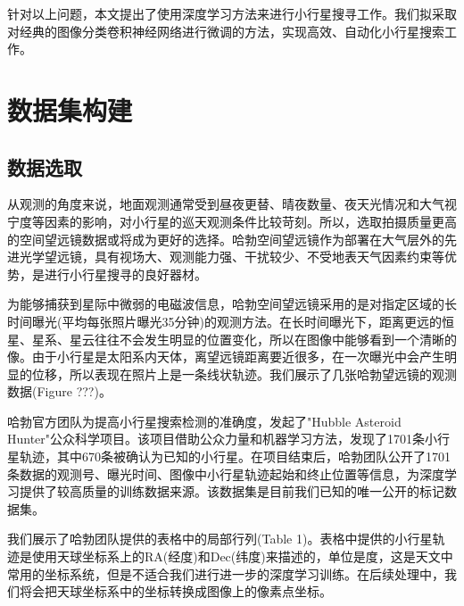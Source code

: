 \documentclass[12pt,a4paper]{article}%
\begin{document}
针对以上问题，本文提出了使用深度学习方法来进行小行星搜寻工作。我们拟采取对经典的图像分类卷积神经网络进行微调的方法，实现高效、自动化小行星搜索工作。

\section{数据集构建}

\subsection{数据选取}

从观测的角度来说，地面观测通常受到昼夜更替、晴夜数量、夜天光情况和大气视宁度等因素的影响，对小行星的巡天观测条件比较苛刻。所以，选取拍摄质量更高的空间望远镜数据或将成为更好的选择。哈勃空间望远镜作为部署在大气层外的先进光学望远镜，具有视场大、观测能力强、干扰较少、不受地表天气因素约束等优势，是进行小行星搜寻的良好器材。

为能够捕获到星际中微弱的电磁波信息，哈勃空间望远镜采用的是对指定区域的长时间曝光(平均每张照片曝光35分钟)的观测方法。在长时间曝光下，距离更远的恒星、星系、星云往往不会发生明显的位置变化，所以在图像中能够看到一个清晰的像。由于小行星是太阳系内天体，离望远镜距离要近很多，在一次曝光中会产生明显的位移，所以表现在照片上是一条线状轨迹。我们展示了几张哈勃望远镜的观测数据(Figure ???)。

哈勃官方团队为提高小行星搜索检测的准确度，发起了"Hubble Asteroid Hunter"公众科学项目。该项目借助公众力量和机器学习方法，发现了1701条小行星轨迹，其中670条被确认为已知的小行星。在项目结束后，哈勃团队公开了1701条数据的观测号、曝光时间、图像中小行星轨迹起始和终止位置等信息，为深度学习提供了较高质量的训练数据来源。该数据集是目前我们已知的唯一公开的标记数据集。

我们展示了哈勃团队提供的表格中的局部行列(Table 1)。表格中提供的小行星轨迹是使用天球坐标系上的RA(经度)和Dec(纬度)来描述的，单位是度，这是天文中常用的坐标系统，但是不适合我们进行进一步的深度学习训练。在后续处理中，我们将会把天球坐标系中的坐标转换成图像上的像素点坐标。
\end{document}
